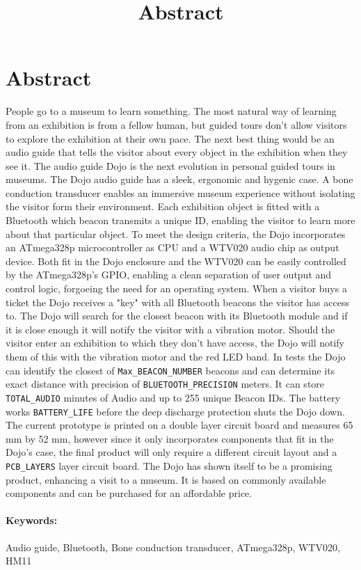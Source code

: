 \documentclass[a4paper]{article}
\title{Abstract}
\begin{document}
\section*{Abstract}

People go to a museum to learn something.
The most natural way of learning from an exhibition is from a fellow human, but guided tours don't allow visitors to explore the exhibition at their own pace.
The next best thing would be an audio guide that tells the visitor about every object in the exhibition when they see it.
The audio guide Dojo is the next evolution in personal guided tours in museums.
The Dojo audio guide has a sleek, ergonomic and hygenic case.
A bone conduction transducer enables an immersive museum experience without isolating the visitor form their environment.
Each exhibition object is fitted with a Bluetooth which beacon transmits a unique ID, enabling the visitor to learn more about that particular object.
To meet the design criteria, the Dojo incorporates an ATmega328p microcontroller as CPU and a WTV020 audio chip as output device.
Both fit in the Dojo enclosure and the WTV020 can be easily controlled by the ATmega328p's GPIO, enabling a clean separation of user output and control logic, forgoeing the need for an operating system.
When a visitor buys a ticket the Dojo receives a "key" with all Bluetooth beacons the visitor has access to.
The Dojo will search for the closest beacon with its Bluetooth module and if it is close enough it will notify the visitor with a vibration motor.
Should the visitor enter an exhibition to which they don't have access, the Dojo will notify them of this with the vibration motor and the red LED band.
In tests the Dojo can identify the closest of \texttt{Max\_BEACON\_NUMBER} beacons and can determine its exact distance with precision of \texttt{BLUETOOTH\_PRECISION} meters.
It can store \texttt{TOTAL\_AUDIO} minutes of Audio and up to 255 unique Beacon IDs.
The battery works \texttt{BATTERY\_LIFE} before the deep discharge protection shuts the Dojo down.
The current prototype is printed on a double layer circuit board and measures 65 mm by 52 mm, however since it only incorporates components that fit in the Dojo's case, the final product will only require a different circuit layout and a \texttt{PCB\_LAYERS} layer circuit board.
The Dojo has shown itself to be a promising product, enhancing a visit to a museum.
It is based on commonly available components and can be purchased for an affordable price.

\paragraph{Keywords:} Audio guide, Bluetooth, Bone conduction transducer, ATmega328p, WTV020, HM11
\end{document}
